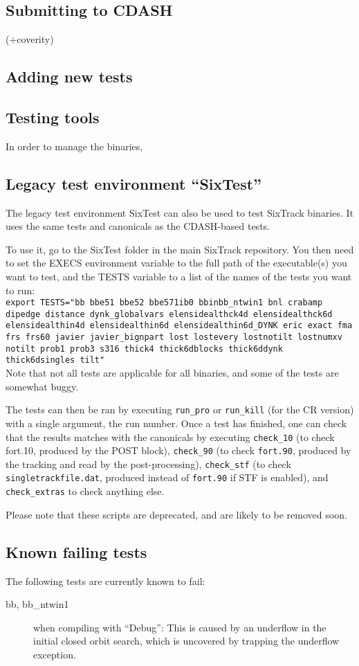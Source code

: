 \documentclass[english]{article}
\begin{document}
\subsection{Submitting to CDASH}

(+coverity)

\subsection{Adding new tests}

\subsection{Testing tools}
In order to manage the binaries, 

\subsection{Legacy test environment ``SixTest''}

The legacy test environment SixTest can also be used to test SixTrack binaries.
It uses the same tests and canonicals as the CDASH-based tests.

To use it, go to the SixTest folder in the main SixTrack repository.
You then need to set the EXECS environment variable to the full path of the executable(s) you want to test, and the TESTS variable to a list of the names of the tests you want to run:\\
{
  \texttt{export TESTS="bb bbe51 bbe52 bbe571ib0  bbinbb\_ntwin1 bnl crabamp dipedge distance dynk\_globalvars elensidealthck4d elensidealthck6d elensidealthin4d elensidealthin6d elensidealthin6d\_DYNK eric exact fma frs frs60 javier javier\_bignpart lost lostevery lostnotilt lostnumxv notilt prob1 prob3 s316 thick4 thick6dblocks thick6ddynk thick6dsingles tilt"}
}\\
Note that not all tests are applicable for all binaries, and some of the tests are somewhat buggy.

The tests can then be ran by executing \texttt{run\_pro} or \texttt{run\_kill} (for the CR version) with a single argument, the run number.
Once a test has finished, one can check that the results matches with the canonicals by executing \texttt{check\_10} (to check fort.10, produced by the POST block), \texttt{check\_90} (to check \texttt{fort.90}, produced by the tracking and read by the post-processing), \texttt{check\_stf} (to check \texttt{singletrackfile.dat}, produced instead of \texttt{fort.90} if STF is enabled), and \texttt{check\_extras} to check anything else.

Please note that these scripts are deprecated, and are likely to be removed soon.

\subsection{Known failing tests}
The following tests are currently known to fail:
\begin{description}
\item[bb, bb\_ntwin1] when compiling with ``Debug'': This is caused by an underflow in the initial closed orbit search, which is uncovered by trapping the underflow exception.
\end{description}
\end{document}

